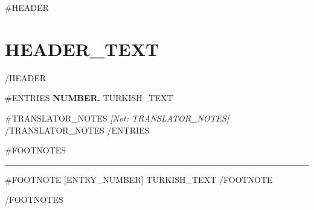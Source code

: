 {{#HEADER}}
\section*{{{HEADER_TEXT}}}
{{/HEADER}}

{{#ENTRIES}}
\textbf{{{NUMBER}}.} {{TURKISH_TEXT}}

{{#TRANSLATOR_NOTES}}
\emph{[Not: {{TRANSLATOR_NOTES}}]}
{{/TRANSLATOR_NOTES}}
{{/ENTRIES}}

{{#FOOTNOTES}}
\begin{small}
\hrule\vspace{0.5em}
{{#FOOTNOTE}}
[{{ENTRY_NUMBER}}] {{TURKISH_TEXT}}
{{/FOOTNOTE}}
\end{small}
{{/FOOTNOTES}}

\newpage
